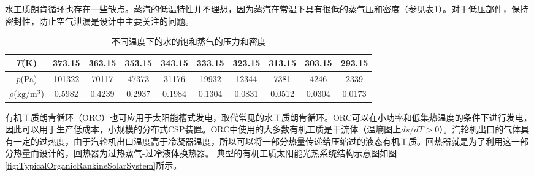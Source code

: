 水工质朗肯循环也存在一些缺点。蒸汽的低温特性并不理想，因为蒸汽在常温下具有很低的蒸气压和密度（参见表\ref{tab:waterT_P_D}）。对于低压部件，保持密封性，防止空气泄漏是设计中主要关注的问题。
\begin{table}[htbp]
	\caption{不同温度下的水的饱和蒸气的压力和密度}
	\begin{center}
	\begin{tabular}{cccccccccc}
		\toprule	
		    $T$(K)    &	373.15	    &    363.15    &    353.15    &    343.15    &    333.15    &    323.15    &    313.15    &    303.15    &    293.15\\
		\midrule	
		    $p$(Pa)    &    101322        &    70117    &    47373    &    31176    &    19932    &    12344    &    7381    &    4246    &    2339\\
		    $\rho$($\mathrm{kg/m^3}$)    &    0.5982        &    0.4239    &    0.2937    &    0.1984    &    0.1304    &    0.0831    &    0.0512    &    0.0304    &    0.0173\\
		\bottomrule
	\end{tabular}
	\end{center}
	\label{tab:waterT_P_D}
\end{table}

有机工质朗肯循环（ORC）也可应用于太阳能槽式发电，取代常见的水工质朗肯循环。ORC可以在小功率和低集热温度的条件下进行发电，因此可以用于生产低成本，小规模的分布式CSP装置。ORC中使用的大多数有机工质是干流体（温熵图上$ds/dT > 0$）。汽轮机出口的气体具有一定的过热度，由于汽轮机出口温度高于冷凝器温度，所以可以将一部分热量传递给压缩过的液态有机工质。回热器就是为了利用这一部分热量而设计的，回热器为过热蒸气-过冷液体换热器。
典型的有机工质太阳能光热系统结构示意图如图\ref{fig:TypicalOrganicRankineSolarSystem}所示。

